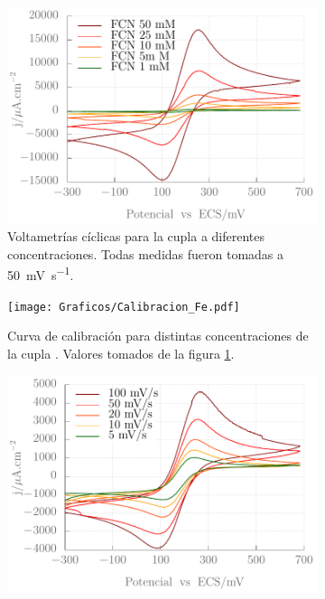 {     		 \begin{figure}[h!]
	 	    	\begin{subfigure}[t]{0.5\textwidth}
	         	\includegraphics[width=\textwidth]{Graficos/Concentraciones_Fe.pdf}
	        	\caption{Voltametrías cíclicas para la cupla \fe\space a diferentes concentraciones. Todas medidas fueron tomadas a \SI{50}{\milli\volt\per\second}.}
	         	\label{fig:Fe_a}
	         	\end{subfigure}
	         	\vspace*{2mm}
     		 \begin{subfigure}[t]{0.495\textwidth}
	        	\texttt{[image: Graficos/Calibracion\_Fe.pdf]}
	       		\caption{Curva de calibración para distintas concentraciones de la cupla \fe. Valores tomados de la figura \ref{fig:Fe_a}.}
	         	\label{fig:Fe_b}
	     		\end{subfigure}
 	     	\begin{subfigure}[t]{0.495\textwidth}
         		\includegraphics[width=\textwidth]{Graficos/Velocidades_Fe.pdf}

\end{subfigure}
\end{figure}}
